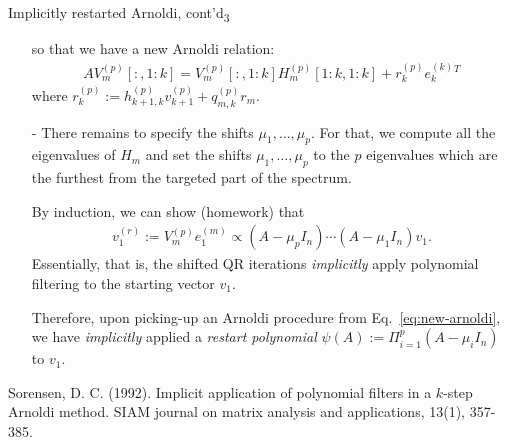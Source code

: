 \documentclass[t,usepdftitle=false]{beamer}
\begin{document}
\begin{frame}{Implicitly restarted Arnoldi, cont'd\textsubscript{3}}
\begin{itemize}
\item[] so that we have a new Arnoldi relation:
\begin{align*}
AV_m^{(p)}[:,1\!:\!k]=
V_m^{(p)}[:,1\!:\!k]H_m^{(p)}[1\!:\!k,1\!:\!k]
+
r_k^{(p)}
e_k^{(k)}{}^T
\end{align*}
where $r_k^{(p)}:=
h^{(p)}_{k+1,k}v_{k+1}^{(p)}+q^{(p)}_{m,k}r_m$.
\item[-]There remains to specify the shifts $\mu_1,\dots,\mu_p$.
For that, we compute all the eigenvalues of $H_m$ and set the shifts $\mu_1,\dots,\mu_p$ to the $p$ eigenvalues which are the furthest from the targeted part of the spectrum.
\item[] By induction, we can show (homework) that
\begin{align}\label{eq:new-arnoldi}
v_1^{(r)}:=V_m^{(p)}e_1^{(m)}\propto (A-\mu_pI_n)\cdots(A-\mu_1I_n)v_1.
\end{align}
Essentially, that is, the shifted QR iterations \textit{implicitly} apply polynomial filtering to the starting vector $v_1$.
\item[] Therefore, upon picking-up an Arnoldi procedure from Eq.~\eqref{eq:new-arnoldi}, we have \textit{implicitly} applied a \textit{restart polynomial} $\psi(A):=\Pi_{i=1}^p(A-\mu_iI_n)$ to $v_1$.
\end{itemize}\smallskip
\tiny{Sorensen, D. C. (1992). Implicit application of polynomial filters in a $k$-step Arnoldi method. SIAM journal on matrix analysis and applications, 13(1), 357-385.}
\end{frame}
\end{document}

